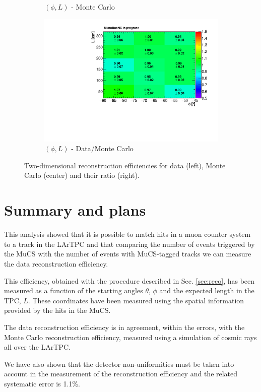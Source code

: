 \documentclass[a4paper]{scrartcl}
\begin{document}
\begin{figure}[htbp]
\begin{subfigure}{0.33\textwidth}
\caption{$(\phi,L)$ - Monte Carlo}
\end{subfigure}\begin{subfigure}{0.33\textwidth}
\includegraphics[width=\linewidth]{figures/phi_l.pdf}
\caption{$(\phi,L)$ - Data/Monte Carlo}
\end{subfigure}
\caption{Two-dimensional reconstruction efficiencies for data (left), Monte Carlo (center) and their ratio (right).}\label{fig:2d}
\end{figure}

\section{Summary and plans}
This analysis showed that it is possible to match hits in a muon counter system to a track in the LArTPC and that comparing the number of events triggered by the MuCS with the number of events with MuCS-tagged tracks we can measure the data reconstruction efficiency.

This efficiency, obtained with the procedure described in Sec. \ref{sec:reco}, has been measured as a function of the starting angles $\theta$, $\phi$ and the expected length in the TPC, $L$. These coordinates have been measured using the spatial information provided by the hits in the MuCS.

The data reconstruction efficiency is in agreement, within the errors, with the Monte Carlo reconstruction efficiency, measured using a simulation of cosmic rays all over the LArTPC.

We have also shown that the detector non-uniformities must be taken into account in the measurement of the reconstruction efficiency and the related systematic error is 1.1\%.
\end{document}
